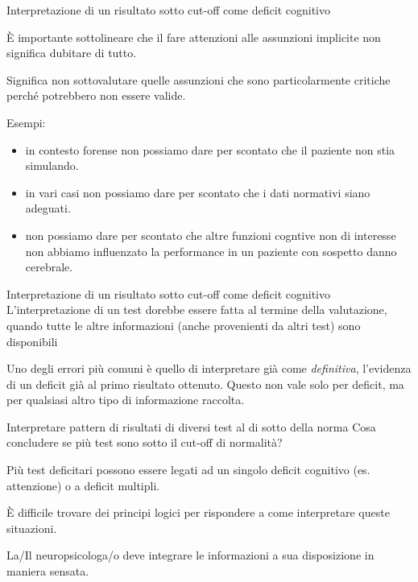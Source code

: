 \documentclass[
  ignorenonframetext,
]{beamer}
\providecommand{\tightlist}{%
  \setlength{\itemsep}{0pt}\setlength{\parskip}{0pt}}
\begin{document}
\begin{frame}{\normalsize Interpretazione di un risultato sotto cut-off
come deficit cognitivo}
\label{interpretazione-di-un-risultato-sotto-cut-off-come-deficit-cognitivo-1}
\small

È importante sottolineare che il fare attenzioni alle assunzioni
implicite non significa dubitare di tutto.

Significa non sottovalutare quelle assunzioni che sono particolarmente
critiche perché potrebbero non essere valide.

Esempi: \pause

\begin{itemize}
\tightlist
\item
  in contesto forense non possiamo dare per scontato che il paziente non
  stia simulando.\pause
\item
  in vari casi non possiamo dare per scontato che i dati normativi siano
  adeguati.\pause
\item
  non possiamo dare per scontato che altre funzioni cogntive non di
  interesse non abbiamo influenzato la performance in un paziente con
  sospetto danno cerebrale.
\end{itemize}
\end{frame}

\begin{frame}{\normalsize Interpretazione di un risultato sotto cut-off
come deficit cognitivo}
\label{interpretazione-di-un-risultato-sotto-cut-off-come-deficit-cognitivo-2}
L'interpretazione di un test dorebbe essere fatta al termine della
valutazione, quando tutte le altre informazioni (anche provenienti da
altri test) sono disponibili

Uno degli errori più comuni è quello di interpretare già come
\emph{definitiva}, l'evidenza di un deficit già al primo risultato
ottenuto. Questo non vale solo per deficit, ma per qualsiasi altro tipo
di informazione raccolta.
\end{frame}

\begin{frame}{\normalsize Interpretare pattern di risultati di diversi
test al di sotto della norma}
\label{interpretare-pattern-di-risultati-di-diversi-test-al-di-sotto-della-norma}
Cosa concludere se più test sono sotto il cut-off di normalità?

Più test deficitari possono essere legati ad un singolo deficit
cognitivo (es. attenzione) o a deficit multipli. \pause

È difficile trovare dei principi logici per rispondere a come
interpretare queste situazioni. \pause

La/Il neuropsicologa/o deve integrare le informazioni a sua disposizione
in maniera sensata.
\end{frame}
\end{document}
